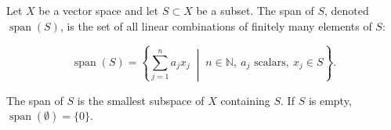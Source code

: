 Let $X$ be a vector space and let $S \subset X$ be a subset. The span of $S$, denoted $\operatorname{span}(S)$, is the set of all linear combinations of finitely many elements of $S$:

$$\operatorname{span}(S) = \left\{ \sum_{j=1}^{n} a_j x_j \;\middle|\; n \in \mathbb{N},\ a_j \text{ scalars},\ x_j \in S \right\}.$$

The span of $S$ is the smallest subspace of $X$ containing $S$. If $S$ is empty, $\operatorname{span}(\emptyset) = \{0\}$.
